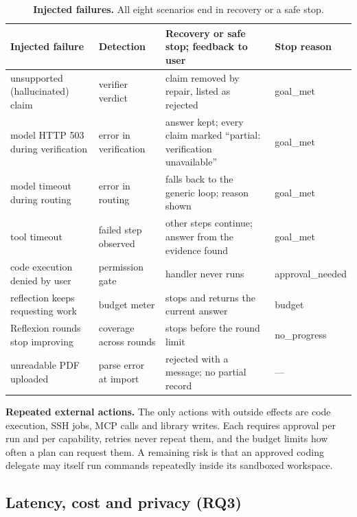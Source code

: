 \documentclass{article}
\newcommand{\RQ}[1]{\textbf{RQ#1}}
\begin{document}
\begin{table}[h]
  \caption{\textbf{Injected failures.} All eight scenarios end in recovery or a safe stop.}
  \label{tab:rel}
  \centering\scriptsize
  \begin{tabularx}{\textwidth}{@{}>{\raggedright\arraybackslash}p{2.9cm}>{\raggedright\arraybackslash}p{2.7cm}>{\raggedright\arraybackslash}X>{\raggedright\arraybackslash}p{1.8cm}@{}}
    \toprule
    \textbf{Injected failure} & \textbf{Detection} & \textbf{Recovery or safe stop; feedback to user} & \textbf{Stop reason} \\
    \midrule
    unsupported (hallucinated) claim & verifier verdict & claim removed by repair, listed as rejected & goal\_met \\
    model HTTP 503 during verification & error in verification & answer kept; every claim marked ``partial: verification unavailable'' & goal\_met \\
    model timeout during routing & error in routing & falls back to the generic loop; reason shown & goal\_met \\
    tool timeout & failed step observed & other steps continue; answer from the evidence found & goal\_met \\
    code execution denied by user & permission gate & handler never runs & approval\_needed \\
    reflection keeps requesting work & budget meter & stops and returns the current answer & budget \\
    Reflexion rounds stop improving & coverage across rounds & stops before the round limit & no\_progress \\
    unreadable PDF uploaded & parse error at import & rejected with a message; no partial record & --- \\
    \bottomrule
  \end{tabularx}
\end{table}

\textbf{Repeated external actions.} The only actions with outside effects are code execution, SSH jobs, MCP calls and library writes. Each requires approval per run and per capability, retries never repeat them, and the budget limits how often a plan can request them. A remaining risk is that an approved coding delegate may itself run commands repeatedly inside its sandboxed workspace.

\subsection{Latency, cost and privacy (\RQ{3})}
\label{sec:res-nfr}
\end{document}
